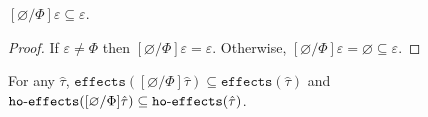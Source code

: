 \documentclass{llncs}
\newcommand{\keywadj}[1]{\mathtt{#1}}
\newcommand{\kwa}[1]{\keywadj{ #1 }}
\newcommand{\hyphen}{\hbox{-}}
\newcommand{\fx}[1]{ \kwa{effects}(#1) }
\newcommand{\hofx}[1]{ \kwa{ho \hyphen effects}(#1) }
\begin{document}
\hrulefill

\begin{lemma}
$[\varnothing/\Phi]\varepsilon \subseteq \varepsilon$.
\end{lemma}

\begin{proof}
If $\varepsilon \neq \Phi$ then $[\varnothing/\Phi]\varepsilon = \varepsilon$. Otherwise, $[\varnothing/\Phi]\varepsilon = \varnothing \subseteq \varepsilon$.
\end{proof}

\hrulefill

\begin{lemma}
For any $\hat \tau$, $\fx{[\varnothing/\Phi]\hat \tau} \subseteq \fx{\hat \tau}$ and $\hofx{[\varnothing/\Phi]\hat \tau} \subseteq \hofx{\hat \tau}$.
\end{lemma}
\end{document}
